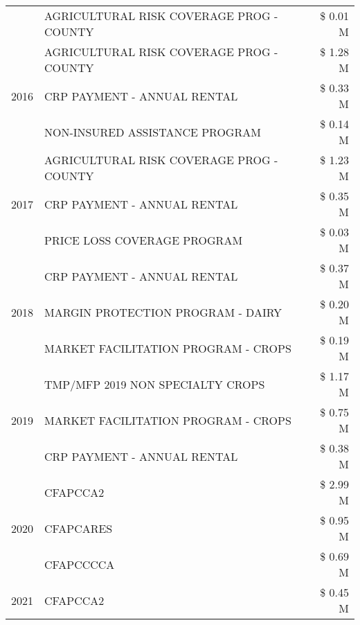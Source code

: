 \begin{tabular}{llr}
 & AGRICULTURAL RISK COVERAGE PROG - COUNTY & \$ 0.01 M \\
\cline{1-3}
\multirow[t]{3}{*}{2016} & AGRICULTURAL RISK COVERAGE PROG - COUNTY & \$ 1.28 M \\
 & CRP PAYMENT - ANNUAL RENTAL & \$ 0.33 M \\
 & NON-INSURED ASSISTANCE PROGRAM & \$ 0.14 M \\
\cline{1-3}
\multirow[t]{3}{*}{2017} & AGRICULTURAL RISK COVERAGE PROG - COUNTY & \$ 1.23 M \\
 & CRP PAYMENT - ANNUAL RENTAL & \$ 0.35 M \\
 & PRICE LOSS COVERAGE PROGRAM & \$ 0.03 M \\
\cline{1-3}
\multirow[t]{3}{*}{2018} & CRP PAYMENT - ANNUAL RENTAL & \$ 0.37 M \\
 & MARGIN PROTECTION PROGRAM - DAIRY & \$ 0.20 M \\
 & MARKET FACILITATION PROGRAM - CROPS & \$ 0.19 M \\
\cline{1-3}
\multirow[t]{3}{*}{2019} & TMP/MFP 2019 NON SPECIALTY CROPS & \$ 1.17 M \\
 & MARKET FACILITATION PROGRAM - CROPS & \$ 0.75 M \\
 & CRP PAYMENT - ANNUAL RENTAL & \$ 0.38 M \\
\cline{1-3}
\multirow[t]{3}{*}{2020} & CFAPCCA2 & \$ 2.99 M \\
 & CFAPCARES & \$ 0.95 M \\
 & CFAPCCCCA & \$ 0.69 M \\
\cline{1-3}
2021 & CFAPCCA2 & \$ 0.45 M \\
\cline{1-3}
\bottomrule
\end{tabular}
